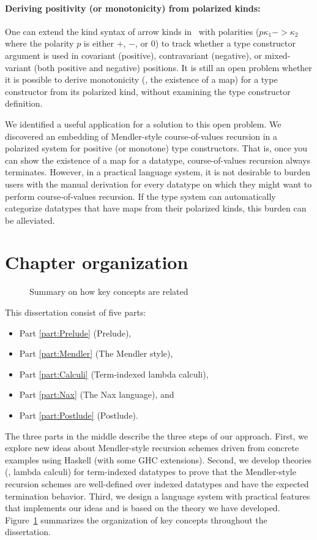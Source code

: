 \paragraph{Deriving positivity (or monotonicity) from polarized kinds:}
One can extend the kind syntax of arrow kinds in \Fw\ with polarities
($p\kappa_1 -> \kappa_2$ where the polarity $p$ is either $+$, $-$, or $0$)
to track whether a type constructor argument is used in
covariant (positive), contravariant (negative), or
mixed-variant (both positive and negative) positions.
It is still an open problem whether it is possible to derive monotonicity
(\ie, the  existence of a map) for a type constructor from its polarized kind,
without examining the type constructor definition.

We identified a useful application for a solution to this open problem.
We discovered an embedding of Mendler-style course-of-values recursion in
a polarized system for positive (or monotone) type constructors.
That is, once you can show the existence of a map for a datatype,
course-of-values recursion always terminates.
However, in a practical language system, it is not desirable to burden users
with the manual derivation for every datatype on which they might want to
perform course-of-values recursion. If the type system can automatically
categorize datatypes that have maps from their polarized kinds,
this burden can be alleviated.

\section{Chapter organization}\label{sec:intro:overview}
\begin{figure}

\caption{Summary on how key concepts are related}
\label{fig:overview}
\end{figure}

This dissertation consist of five parts:
\begin{itemize}
\item Part \ref{part:Prelude} (Prelude),
\item Part \ref{part:Mendler} (The Mendler style),
\item Part \ref{part:Calculi} (Term-indexed lambda calculi),
\item Part \ref{part:Nax} (The Nax language), and
\item Part \ref{part:Postlude} (Postlude).
\end{itemize}
The three parts in the middle describe the three steps of our approach. 
First, we explore new ideas about
Mendler-style recursion schemes driven from concrete examples
using Haskell (with some GHC extensions). Second, we develop
theories (\ie, lambda calculi) for term-indexed datatypes to prove that
the Mendler-style recursion schemes are well-defined over indexed datatypes
and have the expected termination behavior. Third, we design a language system
with practical features that implements our ideas and is based on the
theory we have developed. Figure~\ref{fig:overview} summarizes
the organization of key concepts throughout the dissertation.

